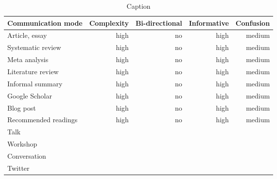 \begin{table*}\centering
{}
\begin{tabular}{@{}lrrrr@{}}\toprule
Communication mode & Complexity & Bi-directional & Informative  & Confusion
\\\midrule
Article, essay & high & no & high & medium  \\
Systematic review & high & no & high & medium\\
Meta analysis & high & no & high & medium\\
Literature review & high & no & high & medium\\
Informal summary & high & no & high & medium\\
Google Scholar & high & no & high & medium\\
Blog post & high & no & high & medium\\
Recommended readings & high & no & high & medium\\
Talk \\
Workshop \\
Conversation \\
Twitter \\


\bottomrule
\end{tabular}
\caption{Caption}
\end{table*}